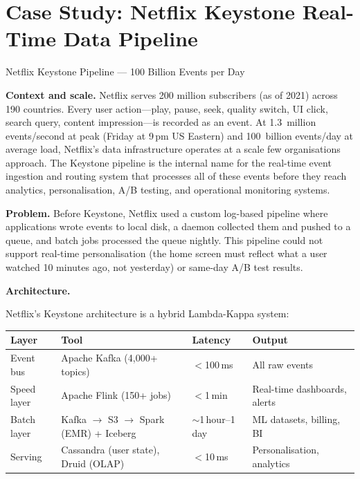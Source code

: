 \section{Case Study: Netflix Keystone Real-Time Data Pipeline}
\label{sec:netflix-case}

\begin{casestudy}{Netflix Keystone Pipeline --- 100 Billion Events per Day}

\textbf{Context and scale.} Netflix serves 200 million subscribers
(as of 2021) across 190 countries. Every user action---play, pause,
seek, quality switch, UI click, search query, content impression---is
recorded as an event. At 1.3~million events/second at peak (Friday at
9\,pm US Eastern) and 100~billion events/day at average load, Netflix's
data infrastructure operates at a scale few organisations approach.
The Keystone pipeline is the internal name for the real-time event
ingestion and routing system that processes all of these events before
they reach analytics, personalisation, A/B testing, and operational
monitoring systems.

\medskip
\textbf{Problem.} Before Keystone, Netflix used a custom log-based
pipeline where applications wrote events to local disk, a daemon
collected them and pushed to a queue, and batch jobs processed the
queue nightly. This pipeline could not support real-time personalisation
(the home screen must reflect what a user watched 10 minutes ago, not
yesterday) or same-day A/B test results.

\medskip
\textbf{Architecture.}

Netflix's Keystone architecture is a hybrid Lambda-Kappa system:

\begin{center}
\small
\renewcommand{\arraystretch}{1.3}
\begin{tabular}{llll}
  \toprule
  \textbf{Layer} & \textbf{Tool} & \textbf{Latency} & \textbf{Output} \\
  \midrule
  Event bus
    & Apache Kafka (4{,}000+ topics)
    & $<$100\,ms
    & All raw events \\
  Speed layer
    & Apache Flink (150+ jobs)
    & $<$1\,min
    & Real-time dashboards, alerts \\
  Batch layer
    & Kafka $\to$ S3 $\to$ Spark (EMR) + Iceberg
    & $\sim$1\,hour--1\,day
    & ML datasets, billing, BI \\
  Serving
    & Cassandra (user state), Druid (OLAP)
    & $<$10\,ms
    & Personalisation, analytics \\
  \bottomrule
\end{tabular}
\end{center}


\end{casestudy}
